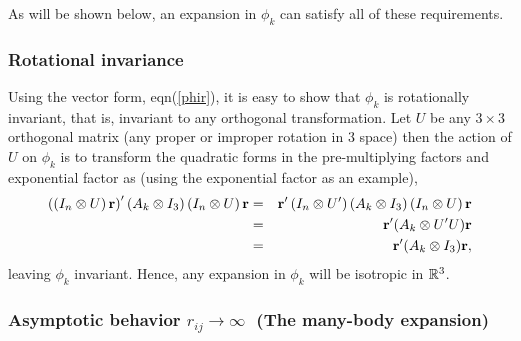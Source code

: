 \noindent As will be shown below, an expansion in $\phi _k$ can satisfy all
of these requirements.

\subsubsection{Rotational invariance}

Using the vector form, eqn(\ref{phir}), it is easy to show that $\phi _k$ is
rotationally invariant, that is, invariant to any orthogonal transformation.
Let $U$ be any $3\times 3$ orthogonal matrix (any proper or improper
rotation in 3 space) then the action of $U$ on $\phi _k$ is to transform the
quadratic forms in the pre-multiplying factors and exponential factor as
(using the exponential factor as an example), 
\begin{eqnarray}
\left( \left( I_n\otimes U\right) {\bf r}\right) ^{\prime }(A_k\otimes
I_3)\left( I_n\otimes U\right) {\bf r} &=&{\bf r}^{\prime }\left( I_n\otimes
U^{\prime }\right) (A_k\otimes I_3)\left( I_n\otimes U\right) {\bf r} \\
&=&{\bf r}^{\prime }(A_k\otimes U^{\prime }U){\bf r} \\
&=&{\bf r}^{\prime }(A_k\otimes I_3){\bf r,}
\end{eqnarray}
leaving $\phi _k$ invariant. Hence, any expansion in $\phi _k$ will be
isotropic in ${\Bbb R}^3$.

\subsubsection{Asymptotic behavior $r_{ij}\rightarrow \infty \,\,\,\,$(The
many-body expansion)}

